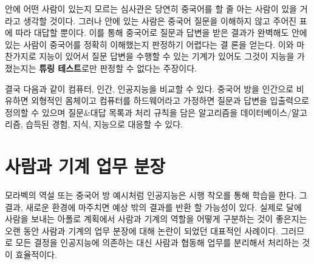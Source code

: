 \documentclass[smallextended]{svjour3}       %
\begin{document}
안에 어떤 사람이 있는지 모르는 심사관은 당연히 중국어를 할 줄 아는
사람이 있을 거라고 생각할 것이다. 그러나 안에 있는 사람은 중국어 질문을
이해하지 않고 주어진 표에 따라 대답할 뿐이다. 이를 통해 중국어로 질문과
답변을 받은 결과가 완벽해도 안에 있는 사람이 중국어를 정확히 이해했는지
판정하기 어렵다는 결 론을 얻는다. 이와 마찬가지로 지능이 있어서 질문
답변을 수행할 수 있는 기계가 있어도 그것이 지능을 가졌는지는
\textbf{튜링 테스트}로만 판정할 수 없다는 주장이다.

\begin{table}[H]
\centering
{}
\end{table}

결국 다음과 같이 컴퓨터, 인간, 인공지능을 비교할 수 있다. 중국어 방을
인간으로 비유하면 외형적인 몸체이고 컴퓨터를 하드웨어라고 가정하면
질문과 답변을 입출력으로 정의할 수 있으며 질문\&대답 목록과 처리 규칙을
담은 알고리즘을 데이터베이스/알고리즘, 습득된 경험, 지식, 지능으로
대응할 수 있다.

\hypertarget{man-human-boundary}{%
\section{사람과 기계 업무 분장}\label{man-human-boundary}}

모라벡의 역설 또는 중국어 방 예시처럼 인공지능은 시행 착오를 통해 학습을
한다. 그 결과, 새로운 환경에 마주치면 예상 밖의 결과를 반환 할 가능성이
있다. 실제로 달에 사람을 보내는 아폴로 계획에서 사람과 기계의 역할을
어떻게 구분하는 것이 좋은지는 오랜 동안 사람과 기계의 업무 분장에 대해
논란이 되었던 대표적인 사례이다. 그러므로 모든 결정을 인공지능에
의존하는 대신 사람과 협동해 업무를 분리해서 처리하는 것이 효율적이다.
\end{document}
